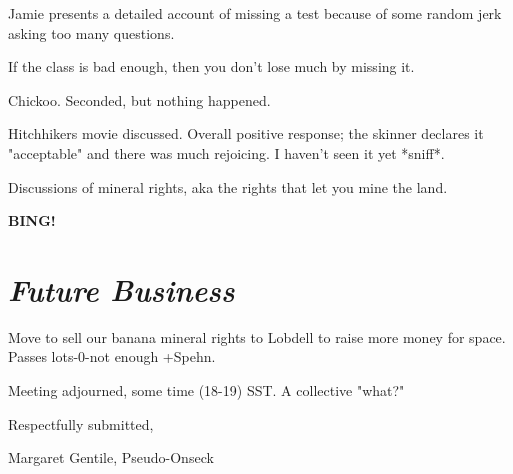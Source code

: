 \documentclass[10pt]{article}
\newcommand{\bing}{{\bf BING!} }
\newcommand{\goto}[1]{\bing \vskip 12pt \section*{{\em{#1}}}}
\begin{document}
Jamie presents a detailed account of missing a test because of some random jerk asking too many questions.

If the class is bad enough, then you don't lose much by missing it.

Chickoo. Seconded, but nothing happened.

Hitchhikers movie discussed. Overall positive response; the skinner declares it "acceptable" and there was much rejoicing. I haven't seen it yet *sniff*.

Discussions of mineral rights, aka the rights that let you mine the land.

\goto{Future Business}

Move to sell our banana mineral rights to Lobdell to raise more money for space. Passes lots-0-not enough +Spehn.

\vspace{12pt}

\noindent
Meeting adjourned, some time (18-19) SST. A collective "what?"

\vspace{18pt}

\centerline{Respectfully submitted,}
\centerline{Margaret Gentile, Pseudo-Onseck}
\end{document}
